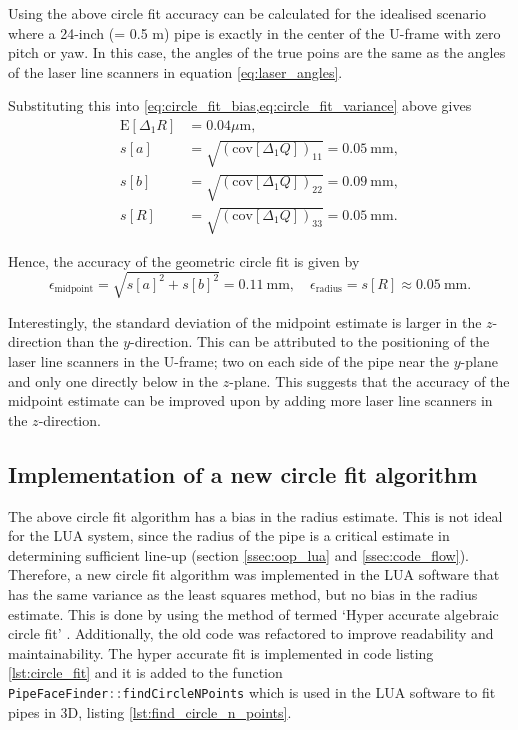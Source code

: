 Using the above circle fit accuracy can be calculated for the idealised scenario where a 24-inch (= 0.5 m) pipe is exactly in the center of the U-frame with zero pitch or yaw. In this case, the angles of the true poins are the same as the angles of the laser line scanners in equation \ref{eq:laser_angles}.

Substituting this into \cref{eq:circle_fit_bias,eq:circle_fit_variance} above gives
\begin{align*}
    \text{E}[\Delta_1 R] & = 0.04 \mu \text{m},                                       \\
    s[a]                 & = \sqrt{(\text{cov}[\Delta_1 Q])_{11}} = 0.05 \ \text{mm}, \\
    s[b]                 & = \sqrt{(\text{cov}[\Delta_1 Q])_{22}} = 0.09 \ \text{mm}, \\
    s[R]                 & = \sqrt{(\text{cov}[\Delta_1 Q])_{33}} = 0.05 \ \text{mm}.
\end{align*}

Hence, the accuracy of the geometric circle fit is given by
\begin{equation}
    \epsilon_{\text{midpoint}} = \sqrt{s[a]^2 + s[b]^2 } = 0.11 \ \text{mm}, \quad \epsilon_{\text{radius}} = s[R] \approx 0.05 \ \text{mm}.
    \label{eq:circle_fit_accuracy}
\end{equation}

Interestingly, the standard deviation of the midpoint estimate is larger in the $z$-direction than the $y$-direction. This can be attributed to the positioning of the laser line scanners in the U-frame; two on each side of the pipe near the $y$-plane and only one directly below in the $z$-plane. This suggests that the accuracy of the midpoint estimate can be improved upon by adding more laser line scanners in the $z$-direction.

\subsection{Implementation of a new circle fit algorithm}
The above circle fit algorithm has a bias in the radius estimate. This is not ideal for the LUA system, since the radius of the pipe is a critical estimate in determining sufficient line-up (section \ref{ssec:oop_lua} and \ref{ssec:code_flow}). Therefore, a new circle fit algorithm was implemented in the LUA software that has the same variance as the least squares method, but no bias in the radius estimate. This is done by using the method of \citeauthor{alsharadqah_chernov_circle_fitting} termed `Hyper accurate algebraic circle fit' \cite{alsharadqah_chernov_circle_fitting}. Additionally, the old code was refactored to improve readability and maintainability. The hyper accurate fit is implemented in code listing \ref{lst:circle_fit} and it is added to the function \lstinline[language=C]|PipeFaceFinder::findCircleNPoints| which is used in the LUA software to fit pipes in 3D, listing \ref{lst:find_circle_n_points}.